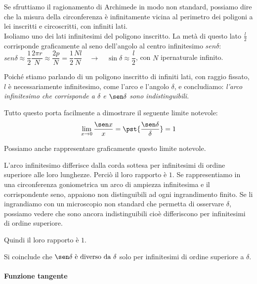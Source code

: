 Se sfruttiamo il ragionamento di Archimede in modo non standard, possiamo dire 
che la misura della circonferenza è infinitamente vicina al perimetro dei 
poligoni a lei inscritti e circoscritti, con infiniti lati.\\
Isoliamo uno dei lati infinitesimi del poligono inscritto. La 
metà di questo lato \(\frac{l}{2}\) corrisponde graficamente al seno 
dell'angolo al centro infinitesimo \(sen \delta\):\\
\(sen \delta \approx \dfrac{1}{2}\dfrac{2\pi r}{N}\approx \dfrac{2p}{N}=
\dfrac{1}{2}\dfrac{Nl}{N}\quad \rightarrow\quad
\sin \delta \approx\dfrac{l}{2}\),\quad
con \(N\) ipernaturale infinito.  

Poiché stiamo parlando di un poligono inscritto di infiniti lati, con 
raggio fissato, \(l\) è necessariamente infinitesimo, come l'arco e l'angolo 
\(\delta\), e concludiamo: \emph{l'arco infinitesimo che corrisponde a  
\(\delta\) e \(\sen\delta\) sono indistinguibili}.

Tutto questo porta facilmente a dimostrare il seguente limite notevole:
\[\lim_{x \rightarrow 0}\frac{\sen x}{x} = 
  \pst{\frac{\sen \delta}{\delta}} = 1\]
  
Possiamo anche rappresentare graficamente questo limite notevole.

\begin{minipage}{.49\textwidth}
L'arco infinitesimo differisce dalla corda sottesa per infinitesimi di ordine 
superiore alle loro lunghezze. Perciò il loro rapporto è \(1\).
Se rappresentiamo in una circonferenza goniometrica un arco di ampiezza 
infinitesima e il corrispondente seno, appaiono non distinguibili ad ogni 
ingrandimento finito. 
Se li ingrandiamo con un microscopio non standard che permetta di 
osservare \(\delta\), possiamo vedere che sono ancora indistinguibili 
cioè differiscono per infinitesimi di ordine superiore. 

Quindi il loro rapporto è \(1\).
\end{minipage}
\hfill
\begin{minipage}{.49\textwidth}
\begin{center} \limiteseno \end{center}
\end{minipage}

Si coinclude che \(\sen \delta \text{ è diverso da } \delta\) solo per 
infinitesimi di ordine superiore a \(\delta\).

\paragraph{Funzione tangente}~

